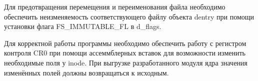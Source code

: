 Для предотвращения перемещения и переименования файла необходимо обеспечить неизменяемость соответствующего файлу объекта dentry при помощи установки флага FS\_IMMUTABLE\_FL в d\_flags.

Для корректной работы программы необходимо обеспечить работу с регистром контроля CR0 при помощи ассеммблерных вставок для возможности изменить необходимые поля у inode. При выгрузке разработанного модуля ядра значения изменённых полей должны возвращаться к исходным.

